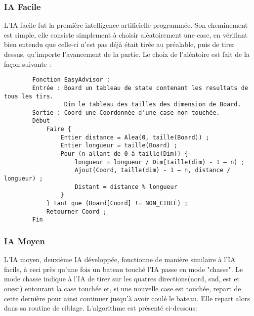 \subsubsection{IA Facile}
    L'IA facile fut la première intelligence artificielle programmée. Son cheminement est simple, elle consiste simplement à choisir aléatoirement une case, en vérifiant bien entendu que celle-ci n'est pas déjà était tirée au préalable, puis de tirer dessus, qu'importe l'avancement de la partie.\newline
    Le choix de l'aléatoire est fait de la façon suivante :\newline
    
    \begin{verbatim}
        Fonction EasyAdvisor :
        Entrée : Board un tableau de state contenant les resultats de tous les tirs.
                 Dim le tableau des tailles des dimension de Board.
        Sortie : Coord une Coordonnée d’une case non touchée.
        Début
            Faire {
                Entier distance = Alea(0, taille(Board)) ;
                Entier longueur = taille(Board) ;
                Pour (n allant de 0 à taille(Dim)) {
                    longueur = longueur / Dim[taille(dim) - 1 – n) ;
                    Ajout(Coord, taille(dim) - 1 – n, distance / longueur) ;
                    Distant = distance % longueur
                }
            } tant que (Board[Coord] != NON_CIBLÉ) ;
            Retourner Coord ;
        Fin
    \end{verbatim}
        
\subsubsection{IA Moyen}
	L'IA moyen, deuxième IA développée, fonctionne de manière similaire à l'IA facile, à ceci près qu'une fois un bateau touché l'IA passe en mode "chasse".\newline
	Le mode chasse indique à l'IA de tirer sur les quatres directions(nord, sud, est et ouest) entourant la case touchée et, si une nouvelle case est touchée, repart de cette dernière pour ainsi continuer jusqu'à avoir coulé le bateau.\newline
	Elle repart alors dans sa routine de ciblage.\newline
	L'algorithme est présenté ci-dessous:
    
